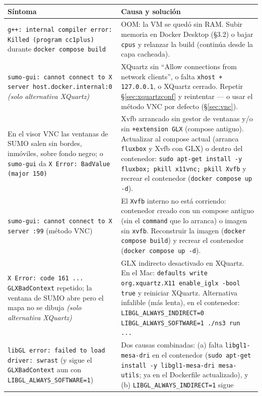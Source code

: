 \documentclass[11pt,a4paper]{article}
\begin{document}
\begin{center}
\small
\begin{tabular}{@{}p{}p{}@{}}
\toprule
\textbf{S\'intoma} & \textbf{Causa y soluci\'on} \\
\midrule
\texttt{g++: internal compiler error: Killed (program cc1plus)} durante
\texttt{docker compose build} & OOM: la VM se qued\'o sin RAM. Subir memoria
en Docker Desktop (\S3.2) o bajar \texttt{cpus} y relanzar la build (contin\'ua
desde la capa cacheada). \\
\midrule
\texttt{sumo-gui: cannot connect to X server host.docker.internal:0}
\emph{(solo alternativa XQuartz)} &
XQuartz sin ``Allow connections from network clients'', o falta
\texttt{xhost + 127.0.0.1}, o XQuartz cerrado. Repetir
\S\ref{sec:xquartzconf} y reintentar --- o usar el m\'etodo VNC por defecto
(\S\ref{sec:vnc}). \\
\midrule
En el visor VNC las ventanas de SUMO salen sin bordes, inm\'oviles, sobre
fondo negro; o \texttt{sumo-gui} da \texttt{X Error: BadValue (major 150)} &
Xvfb arrancado sin gestor de ventanas y/o sin \texttt{+extension GLX}
(compose antiguo). Actualizar al compose actual (arranca
\texttt{fluxbox} y Xvfb con GLX) o dentro del contenedor:
\texttt{sudo apt-get install -y fluxbox; pkill x11vnc; pkill Xvfb} y recrear el
contenedor (\texttt{docker compose up -d}). \\
\midrule
\texttt{sumo-gui: cannot connect to X server :99} (m\'etodo VNC) & El
\texttt{Xvfb} interno no est\'a corriendo: contenedor creado con un compose
antiguo (sin el \texttt{command} que lo arranca) o imagen sin
\texttt{xvfb}. Reconstruir la imagen (\texttt{docker compose build}) y recrear el
contenedor (\texttt{docker compose up -d}). \\
\midrule
\texttt{X Error: code 161 ... GLXBadContext} repetido; la ventana de SUMO
abre pero el mapa no se dibuja \emph{(solo alternativa XQuartz)} & GLX
indirecto desactivado en XQuartz.
En el Mac: \texttt{defaults write org.xquartz.X11 enable\_iglx -bool true} y
reiniciar XQuartz.
Alternativa infalible (m\'as lenta), en el contenedor:
\texttt{LIBGL\_ALWAYS\_INDIRECT=0 LIBGL\_ALWAYS\_SOFTWARE=1 ./ns3 run ...} \\
\midrule
\texttt{libGL error: failed to load driver: swrast} (y sigue el
\texttt{GLXBadContext} aun con \texttt{LIBGL\_ALWAYS\_SOFTWARE=1}) & Dos
causas combinadas: (a) falta \texttt{libgl1-mesa-dri} en el contenedor
(\texttt{sudo apt-get install -y libgl1-mesa-dri mesa-utils}; ya en el
Dockerfile actualizado), y (b) \texttt{LIBGL\_ALWAYS\_INDIRECT=1} sigue

\end{tabular}
\end{center}
\end{document}
